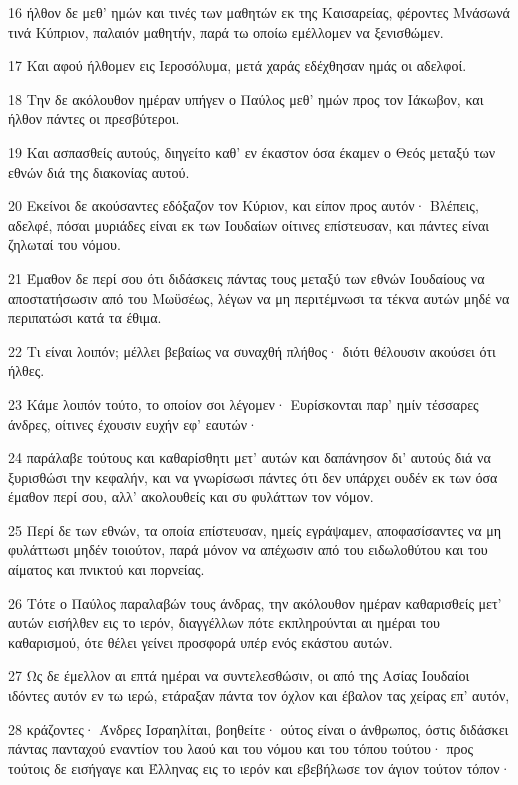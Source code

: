 \par 16 ήλθον δε μεθ' ημών και τινές των μαθητών εκ της Καισαρείας, φέροντες Μνάσωνά τινά Κύπριον, παλαιόν μαθητήν, παρά τω οποίω εμέλλομεν να ξενισθώμεν.
\par 17 Και αφού ήλθομεν εις Ιεροσόλυμα, μετά χαράς εδέχθησαν ημάς οι αδελφοί.
\par 18 Την δε ακόλουθον ημέραν υπήγεν ο Παύλος μεθ' ημών προς τον Ιάκωβον, και ήλθον πάντες οι πρεσβύτεροι.
\par 19 Και ασπασθείς αυτούς, διηγείτο καθ' εν έκαστον όσα έκαμεν ο Θεός μεταξύ των εθνών διά της διακονίας αυτού.
\par 20 Εκείνοι δε ακούσαντες εδόξαζον τον Κύριον, και είπον προς αυτόν· Βλέπεις, αδελφέ, πόσαι μυριάδες είναι εκ των Ιουδαίων οίτινες επίστευσαν, και πάντες είναι ζηλωταί του νόμου.
\par 21 Έμαθον δε περί σου ότι διδάσκεις πάντας τους μεταξύ των εθνών Ιουδαίους να αποστατήσωσιν από του Μωϋσέως, λέγων να μη περιτέμνωσι τα τέκνα αυτών μηδέ να περιπατώσι κατά τα έθιμα.
\par 22 Τι είναι λοιπόν; μέλλει βεβαίως να συναχθή πλήθος· διότι θέλουσιν ακούσει ότι ήλθες.
\par 23 Κάμε λοιπόν τούτο, το οποίον σοι λέγομεν· Ευρίσκονται παρ' ημίν τέσσαρες άνδρες, οίτινες έχουσιν ευχήν εφ' εαυτών·
\par 24 παράλαβε τούτους και καθαρίσθητι μετ' αυτών και δαπάνησον δι' αυτούς διά να ξυρισθώσι την κεφαλήν, και να γνωρίσωσι πάντες ότι δεν υπάρχει ουδέν εκ των όσα έμαθον περί σου, αλλ' ακολουθείς και συ φυλάττων τον νόμον.
\par 25 Περί δε των εθνών, τα οποία επίστευσαν, ημείς εγράψαμεν, αποφασίσαντες να μη φυλάττωσι μηδέν τοιούτον, παρά μόνον να απέχωσιν από του ειδωλοθύτου και του αίματος και πνικτού και πορνείας.
\par 26 Τότε ο Παύλος παραλαβών τους άνδρας, την ακόλουθον ημέραν καθαρισθείς μετ' αυτών εισήλθεν εις το ιερόν, διαγγέλλων πότε εκπληρούνται αι ημέραι του καθαρισμού, ότε θέλει γείνει προσφορά υπέρ ενός εκάστου αυτών.
\par 27 Ως δε έμελλον αι επτά ημέραι να συντελεσθώσιν, οι από της Ασίας Ιουδαίοι ιδόντες αυτόν εν τω ιερώ, ετάραξαν πάντα τον όχλον και έβαλον τας χείρας επ' αυτόν,
\par 28 κράζοντες· Άνδρες Ισραηλίται, βοηθείτε· ούτος είναι ο άνθρωπος, όστις διδάσκει πάντας πανταχού εναντίον του λαού και του νόμου και του τόπου τούτου· προς τούτοις δε εισήγαγε και Έλληνας εις το ιερόν και εβεβήλωσε τον άγιον τούτον τόπον·
